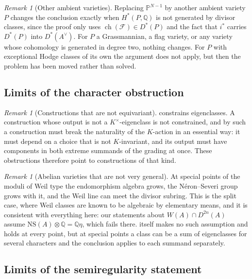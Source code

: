 \documentclass[11pt,reqno]{amsart}
\theoremstyle{plain}
\theoremstyle{definition}
\theoremstyle{remark}
\newtheorem{remark}[theorem]{Remark}
\newcommand{\QQ}{\mathbb{Q}}
\newcommand{\PP}{\mathbb{P}}
\newcommand{\Av}{A^{\vee}}
\newcommand{\cF}{\mathcal{F}}
\newcommand{\HW}{W}                      %
\newcommand{\NS}{\mathrm{NS}}
\DeclareMathOperator{\ch}{ch}
\newcommand{\Kx}{K^{\times}}
\begin{document}
\begin{remark}[Other ambient varieties]\label{rem:otherambient}
Replacing $\PP^{N-1}$ by another ambient variety $P$ changes the conclusion
exactly when $H^{*}(P,\QQ)$ is not generated by divisor classes, since the
proof only uses $\ch(\cF)\in D^{*}(P)$ and the fact that $i^{*}$ carries
$D^{*}(P)$ into $D^{*}(\Av)$. For $P$ a Grassmannian, a flag variety, or any
variety whose cohomology is generated in degree two, nothing changes. For $P$
with exceptional Hodge classes of its own the argument does not apply, but
then the problem has been moved rather than solved.
\end{remark}

\subsection{Limits of the character obstruction}

\begin{remark}[Constructions that are not equivariant]\label{rem:nonequivariant}
\cite[Theorem~5.6]{paperI} constrains eigenclasses. A construction whose output is
not a $\Kx$-eigenclass is not constrained, and by \cite[Remark~5.8]{paperI}
such a construction must break the naturality of the $K$-action in an
essential way: it must depend on a choice that is not $K$-invariant, and its
output must have components in both extreme summands of the grading at once.
These obstructions therefore point to constructions of that kind.
\end{remark}

\begin{remark}[Abelian varieties that are not very general]\label{rem:special}
At special points of the moduli of Weil type the endomorphism algebra grows,
the N\'eron--Severi group grows with it, and the Weil line can meet the divisor
subring. This is the split case, where Weil classes are known to be algebraic
by elementary means, and it is consistent with everything here: our statements
about $\HW(A)\cap D^{2n}(A)$ assume $\NS(A)\otimes\QQ=\QQ\eta$, which fails
there. \cite[Theorem~5.6]{paperI} itself makes no such assumption and holds at every
point, but at special points a class can be a sum of eigenclasses for several
characters and the conclusion applies to each summand separately.
\end{remark}

\subsection{Limits of the semiregularity statement}
\end{document}
